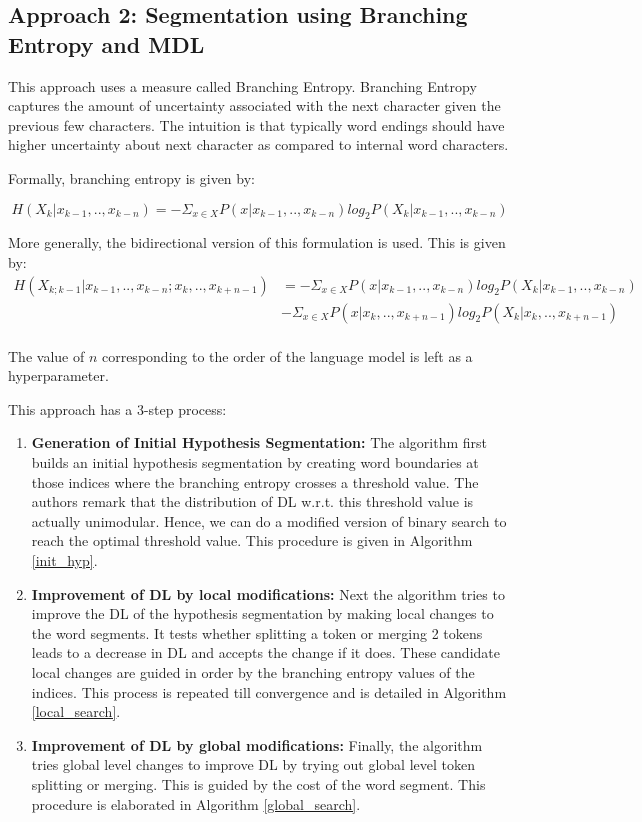 \documentclass[runningheads]{llncs}
\begin{document}
\subsection{Approach 2: Segmentation using Branching Entropy and MDL}

This approach uses a measure called Branching Entropy. Branching Entropy captures the amount of uncertainty associated with the next character given the previous few characters. The intuition is that typically word endings should have higher uncertainty about next character as compared to internal word characters. 

Formally, branching entropy is given by:

$$H(X_k|x_{k-1},..,x_{k-n}) = - \Sigma_{x \in X} P(x|x_{k-1},..,x_{k-n})log_2 P(X_k|x_{k-1},..,x_{k-n})$$

More generally, the bidirectional version of this formulation is used. This is given by: 
\begin{align*}
    H(X_{k;k-1}|x_{k-1},..,x_{k-n};x_{k},..,x_{k+n-1}) & = -\Sigma_{x \in X} P(x|x_{k-1},..,x_{k-n})log_2 P(X_k|x_{k-1},..,x_{k-n}) \\
    & -\Sigma_{x \in X} P(x|x_{k},..,x_{k+n-1})log_2 P(X_k|x_{k},..,x_{k+n-1}) \\
\end{align*}

The value of $n$ corresponding to the order of the language model is left as a hyperparameter.

This approach has a 3-step process:
\begin{enumerate}
    \item \textbf{Generation of Initial Hypothesis Segmentation:} The algorithm first builds an initial hypothesis segmentation by creating word boundaries at those indices where the branching entropy crosses a threshold value. The authors remark that the distribution of DL w.r.t. this threshold value is actually unimodular. Hence, we can do a modified version of binary search to reach the optimal threshold value. This procedure is given in Algorithm \ref{init_hyp}.
    \item \textbf{Improvement of DL by local modifications:} Next the algorithm tries to improve the DL of the hypothesis segmentation by making local changes to the word segments. It tests whether splitting a token or merging 2 tokens leads to a decrease in DL and accepts the change if it does. These candidate local changes are guided in order by the branching entropy values of the indices. This process is repeated till convergence and is detailed in Algorithm \ref{local_search}.
    \item \textbf{Improvement of DL by global modifications:} Finally, the algorithm tries global level changes to improve DL by trying out global level token splitting or merging. This is guided by the cost of the word segment. This procedure is elaborated in Algorithm \ref{global_search}.
\end{enumerate}
\end{document}
